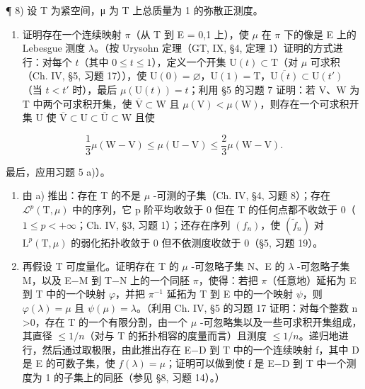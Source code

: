 ¶ 8) 设 T 为紧空间，μ 为 T 上总质量为 1 的弥散正测度。

\begin{enumerate}
\def\labelenumi{\alph{enumi})}
\tightlist
\item
  证明存在一个连续映射 \(\pi\)（从 T 到 E = {}0,1{} 上），使 \(\mu\) 在 \(\pi\) 下的像是 E 上的 Lebesgue 测度 \(\lambda\)。（按 Urysohn 定理（GT, IX, §4, 定理 1）证明的方式进行：对每个 \(t\)（其中 \(0 \leqslant t \leqslant 1\)），定义一个开集 \(\mathrm{U}(t) \subset \mathrm{T}\)（对 \(\mu\) 可求积（Ch. IV, §5, 习题 17）），使 \(\mathrm{U}(0) = \varnothing\)，\(\mathrm{U}(1) = \mathrm{T}\)，\(\overline{\mathrm{U}(t)} \subset \mathrm{U}(t')\)（当 \(t < t'\) 时），最后 \(\mu(\mathrm{U}(t)) = t\)；利用 §5 的习题 7 证明：若 V、W 为 T 中两个可求积开集，使 \(\overline{\mathrm{V}} \subset \mathrm{W}\) 且 \(\mu(\mathrm{V}) < \mu(\mathrm{W})\)，则存在一个可求积开集 U 使 \(\overline{\mathrm{V}} \subset \mathrm{U} \subset \overline{\mathrm{U}} \subset \mathrm{W}\) 且使
\end{enumerate}

\[
\frac {1}{3} \mu (\mathrm{W-V}) \leqslant \mu (\mathrm{U-V}) \leqslant \frac {2}{3} \mu (\mathrm{W-V}).
\]

最后，应用习题 5 a)）。

\begin{enumerate}
\def\labelenumi{\alph{enumi})}
\setcounter{enumi}{1}
\item
  由 a) 推出：存在 T 的不是 \(\mu\) -可测的子集（Ch. IV, §4, 习题 8）；存在 \(\mathcal{L}^{p}(\mathrm{T},\mu)\) 中的序列，它 p 阶平均收敛于 0 但在 T 的任何点都不收敛于 0（\(1 \leqslant p < +\infty\)；Ch. IV, §3, 习题 1）；还存在序列 \((f_{n})\)，使 \((\widetilde{f}_{n})\) 对 \(\mathrm{L}^{p}(\mathrm{T},\mu)\) 的弱化拓扑收敛于 0 但不依测度收敛于 0（§5, 习题 19）。
\item
  再假设 T 可度量化。证明存在 T 的 \(\mu\) -可忽略子集 N、E 的 \(\lambda\) -可忽略子集 M，以及 E−M 到 T−N 上的一个同胚 \(\pi\)，使得：若把 \(\pi\)（任意地）延拓为 E 到 T 中的一个映射 \(\varphi\)，并把 \(\pi^{-1}\) 延拓为 T 到 E 中的一个映射 \(\psi\)，则 \(\varphi(\lambda)=\mu\) 且 \(\psi(\mu)=\lambda\)。（利用 Ch. IV, §5 的习题 17 证明：对每个整数 n \textgreater 0，存在 T 的一个有限分割，由一个 \(\mu\) -可忽略集以及一些可求积开集组成，其直径 \(\leqslant1/n\)（对与 T 的拓扑相容的度量而言）且测度 \(\leqslant1/n\)。递归地进行，然后通过取极限，由此推出存在 E−D 到 T 中的一个连续映射 f，其中 D 是 E 的可数子集，使 \(f(\lambda)=\mu\)；证明可以做到使 f 是 E−D 到 T 中一个测度为 1 的子集上的同胚（参见 §8, 习题 14）。）
\end{enumerate}

